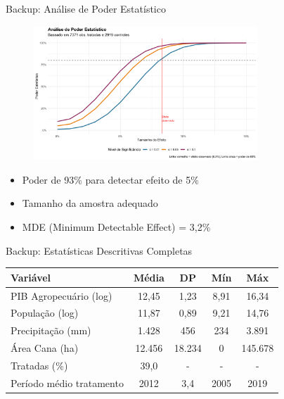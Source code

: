\documentclass[10pt,aspectratio=169]{beamer}
\begin{document}
\appendix

\begin{frame}{Backup: Análise de Poder Estatístico}
\begin{figure}
\centering
\includegraphics[width=0.75\textwidth]{../../../data/outputs/additional_figures/power_analysis_simulation.png}
\end{figure}

\begin{itemize}
    \item Poder de 93\% para detectar efeito de 5\%
    \item Tamanho da amostra adequado
    \item MDE (Minimum Detectable Effect) = 3,2\%
\end{itemize}
\end{frame}

\begin{frame}{Backup: Estatísticas Descritivas Completas}
\begin{table}[h]
\centering
\footnotesize
\begin{tabular}{lcccc}
\toprule
Variável & Média & DP & Mín & Máx \\
\midrule
PIB Agropecuário (log) & 12,45 & 1,23 & 8,91 & 16,34 \\
População (log) & 11,87 & 0,89 & 9,21 & 14,76 \\
Precipitação (mm) & 1.428 & 456 & 234 & 3.891 \\
Área Cana (ha) & 12.456 & 18.234 & 0 & 145.678 \\
\midrule
Tratadas (\%) & 39,0 & - & - & - \\
Período médio tratamento & 2012 & 3,4 & 2005 & 2019 \\
\bottomrule
\end{tabular}
\end{table}
\end{frame}
\end{document}
